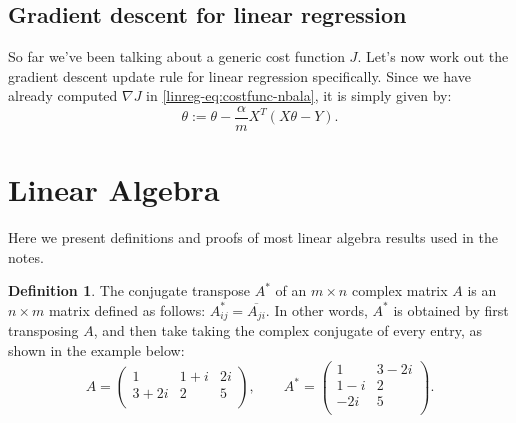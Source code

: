 \documentclass{article}
\theoremstyle{definition}
\newtheorem{definition}{Definition}[section]
\begin{document}
\subsection{Gradient descent for linear regression}
So far we've been talking about a generic cost function $J$.
Let's now work out the gradient descent update rule for linear regression specifically. Since we have already computed $\nabla J$ in \eqref{linreg-eq:costfunc-nbala}, it is simply given by:
\begin{equation}
    \theta := \theta - \frac{\alpha}{m}X^T(X\theta - Y).
\end{equation}






\clearpage
\appendix
\section{Linear Algebra}
Here we present definitions and proofs of most linear algebra results used in the notes.
\begin{definition}
The conjugate transpose $A^*$ of an $m\times n$ complex matrix $A$ is an $n \times m$ matrix defined as follows: $A^*_{ij}=\overline{A_{ji}}$. In other words, $A^*$ is obtained by first transposing $A$, and then take taking the complex conjugate of every entry, as shown in the example below:
\begin{equation}
    A =
    \begin{pmatrix}
        1 & 1+i & 2i \\
        3+2i & 2 & 5 \\
    \end{pmatrix},
    \qquad
    A^* =
    \begin{pmatrix}
        1 & 3-2i \\
        1-i & 2 \\
        -2i & 5 \\
    \end{pmatrix}.
\end{equation}
\end{definition}
\end{document}
